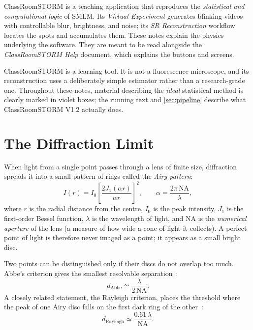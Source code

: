 \documentclass[11pt,a4paper]{article}
\newcommand{\app}{ClassRoomSTORM}
\begin{document}
\app{} is a teaching application that reproduces the \emph{statistical and
computational logic} of SMLM. Its \emph{Virtual Experiment} generates blinking
videos with controllable blur, brightness, and noise; its \emph{SR
Reconstruction} workflow locates the spots and accumulates them. These notes
explain the physics underlying the software. They are meant to be read alongside
the \emph{\app{} Help} document, which explains the buttons and screens.

\begin{csnote}
\app{} is a learning tool. It is not a fluorescence microscope, and its
reconstruction uses a deliberately simple estimator rather than a
research-grade one. Throughout these notes, material describing the
\emph{ideal} statistical method is clearly marked in violet boxes; the running
text and \cref{sec:pipeline} describe what \app{} V1.2 actually does.
\end{csnote}

\section{The Diffraction Limit}
\label{sec:diffraction}

When light from a single point passes through a lens of finite size, diffraction
spreads it into a small pattern of rings called the \emph{Airy pattern}:
\begin{equation}
  I(r) = I_0\left[\frac{2J_1(\alpha r)}{\alpha r}\right]^{2},
  \qquad \alpha = \frac{2\pi\,\mathrm{NA}}{\lambda},
  \label{eq:airy}
\end{equation}
where $r$ is the radial distance from the centre, $I_0$ is the peak intensity,
$J_1$ is the first-order Bessel function, $\lambda$ is the wavelength of light,
and $\mathrm{NA}$ is the \emph{numerical aperture} of the lens (a measure of how
wide a cone of light it collects). A perfect point of light is therefore never
imaged as a point; it appears as a small bright disc.

Two points can be distinguished only if their discs do not overlap too much. Abbe's
criterion gives the smallest resolvable separation~\cite{abbe1873,
bechhoefer2015}:
\begin{equation}
  d_{\mathrm{Abbe}} \simeq \frac{\lambda}{2\,\mathrm{NA}}.
  \label{eq:abbe}
\end{equation}
A closely related statement, the Rayleigh criterion, places the threshold where
the peak of one Airy disc falls on the first dark ring of the
other~\cite{bechhoefer2015, prakash2024}:
\begin{equation}
  d_{\mathrm{Rayleigh}} \simeq \frac{0.61\,\lambda}{\mathrm{NA}}.
  \label{eq:rayleigh}
\end{equation}
\end{document}
